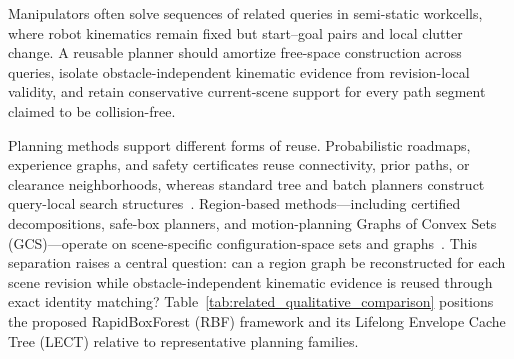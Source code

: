 \documentclass[journal]{IEEEtran}
\newcommand{\rbf}{RBF}
\begin{document}
Manipulators often solve sequences of related queries in semi-static workcells,
where robot kinematics remain fixed but start--goal pairs and local clutter
change. A reusable planner should amortize free-space construction across
queries, isolate obstacle-independent kinematic evidence from revision-local
validity, and retain conservative current-scene support for every path segment
claimed to be collision-free.

Planning methods support different forms of reuse. Probabilistic roadmaps,
experience graphs, and safety certificates reuse connectivity, prior paths, or
clearance neighborhoods, whereas standard tree and batch planners construct
query-local search structures~\cite{kavraki1996probabilistic,
bialkowski2016safety,coleman2015experience}. Region-based methods---including
certified decompositions, safe-box planners, and motion-planning Graphs of
Convex Sets (GCS)---operate on scene-specific configuration-space sets and
graphs~\cite{dai2024certified,marcucci2024fastboxes,
marcucci2024shortest,morozov2026multiquery}. This separation raises a central
question: can a region graph be reconstructed for each scene revision while
obstacle-independent kinematic evidence is reused through exact identity
matching? Table~\ref{tab:related_qualitative_comparison} positions the proposed
RapidBoxForest (\rbf{}) framework and its Lifelong Envelope Cache Tree (LECT)
relative to representative planning families.
\end{document}
